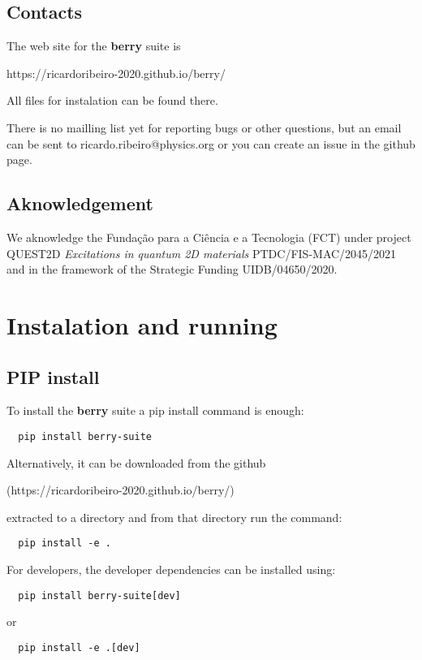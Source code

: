 \documentclass[a4paper,12pt]{report}
\begin{document}
\section{Contacts}

The web site for the \textbf{berry} suite is\medskip

https://ricardoribeiro-2020.github.io/berry/\medskip

All files for instalation can be found there.

There is no mailling list yet for reporting bugs or other questions, but an email can be sent to
ricardo.ribeiro@physics.org or you can create an issue in the github page.

\section{Aknowledgement}

We aknowledge the Fundação para a Ciência e a Tecnologia (FCT)
under project \\ QUEST2D \emph{Excitations in quantum 2D materials}
PTDC/FIS-MAC/2045/2021 \\
and in the framework of the Strategic Funding UIDB/04650/2020.






\chapter{Instalation and running}

\section{PIP install}

To install the \textbf{berry} suite a pip install command is enough:
\begin{verbatim}
  pip install berry-suite
\end{verbatim}

Alternatively, it can be downloaded from the github

(https://ricardoribeiro-2020.github.io/berry/)

extracted to a directory and from that directory run the command:
\begin{verbatim}
  pip install -e .
\end{verbatim}

For developers, the developer dependencies can be installed using:
\begin{verbatim}
  pip install berry-suite[dev]
\end{verbatim}
or
\begin{verbatim}
  pip install -e .[dev]
\end{verbatim}
\end{document}
